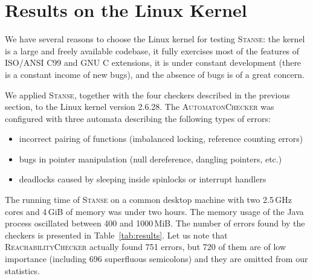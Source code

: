 \documentclass{llncs}
\newcommand{\Stanse}{\textsc{Stanse}\xspace}
\newcommand{\AC}{\textsc{AutomatonChecker}\xspace}
\newcommand{\RC}{\textsc{ReachabilityChecker}\xspace}
\begin{document}

\section{Results on the Linux Kernel}
\label{sec:results}

We have several reasons to choose the Linux kernel for testing \Stanse: the
kernel is a large and freely available codebase, it fully exercises most
of the features of ISO/ANSI C99 and GNU C extensions, it is under constant
development (there is a constant income of new bugs), and the absence of bugs is
of a great concern. 

We applied \Stanse, together with the four checkers described in the
previous section, to the Linux kernel version 2.6.28. The \AC was configured
with three automata describing the following types of errors:
\begin{itemize}
\item incorrect pairing of functions (imbalanced locking, reference
  counting errors)
\item bugs in pointer manipulation (null dereference, dangling pointers, etc.)
\item deadlocks caused by sleeping inside spinlocks or interrupt handlers
\end{itemize}

The running time of \Stanse on a common desktop machine with two 2.5\,GHz
cores and 4\,GiB of memory was under two hours. The memory usage of the Java
process oscillated between 400 and 1000\,MiB. The number of errors found by
the checkers is presented in Table~\ref{tab:results}. Let us note that \RC
actually found 751 errors, but 720 of them are of low importance
(including 696 superfluous semicolons) and they are omitted from our
statistics.
\end{document}

